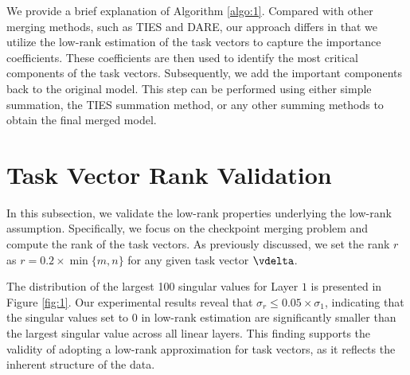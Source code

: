 We provide a brief explanation of Algorithm \ref{algo:1}.
Compared with other merging methods, such as TIES and DARE, our approach differs in that we utilize the low-rank estimation of the task vectors to capture the importance coefficients. These coefficients are then used to identify the most critical components of the task vectors.
Subsequently, we add the important components back to the original model. This step can be performed using either simple summation, the TIES summation method, or any other summing methods to obtain the final merged model.

\section{Task Vector Rank Validation}

In this subsection, we validate the low-rank properties underlying the low-rank assumption. Specifically, we focus on the checkpoint merging problem and compute the rank of the task vectors. As previously discussed, we set the rank $r$ as $r = 0.2 \times \min \{ m, n \}$ for any given task vector $\vdelta$.

The distribution of the largest 100 singular values for Layer $1$ is presented in Figure \ref{fig:1}. Our experimental results reveal that $\sigma_r \leq 0.05 \times \sigma_1$, indicating that the singular values set to $0$ in low-rank estimation are significantly smaller than the largest singular value across all linear layers. This finding supports the validity of adopting a low-rank approximation for task vectors, as it reflects the inherent structure of the data.

